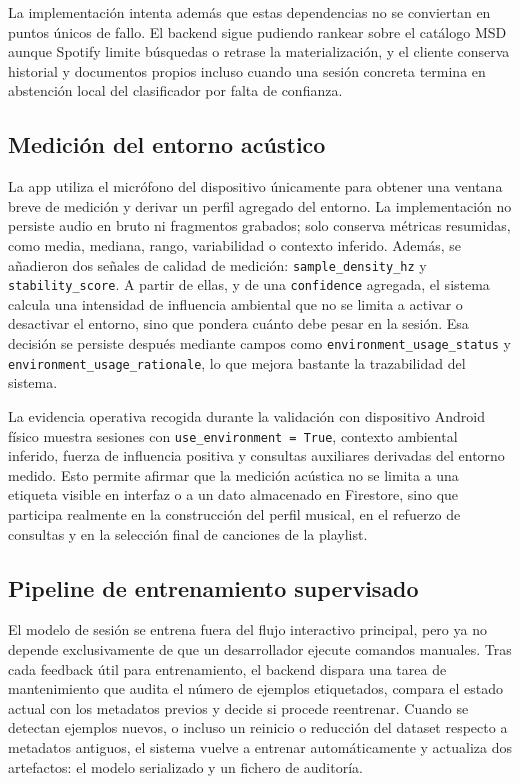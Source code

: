 La implementación intenta además que estas dependencias no se conviertan
en puntos únicos de fallo. El backend sigue pudiendo rankear sobre el catálogo
MSD aunque Spotify limite búsquedas o retrase la materialización, y el cliente conserva historial y
documentos propios incluso cuando una sesión concreta termina en abstención local
del clasificador por falta de confianza.

\subsection{Medición del entorno acústico}

La app utiliza el micrófono del dispositivo únicamente para obtener una ventana
breve de medición y derivar un perfil agregado del entorno. La implementación no
persiste audio en bruto ni fragmentos grabados; solo conserva métricas
resumidas, como media, mediana, rango, variabilidad o contexto inferido.
Además, se añadieron dos señales de calidad de medición:
\texttt{sample\_density\_hz} y \texttt{stability\_score}. A partir de ellas, y
de una \texttt{confidence} agregada, el sistema calcula una intensidad de
influencia ambiental que no se limita a activar o desactivar el entorno, sino
que pondera cuánto debe pesar en la sesión. Esa decisión se persiste después
mediante campos como \texttt{environment\_usage\_status} y
\texttt{environment\_usage\_rationale}, lo que mejora bastante la trazabilidad
del sistema.

La evidencia operativa recogida durante la validación con dispositivo Android
físico muestra sesiones con \texttt{use\_environment = True}, contexto
ambiental inferido, fuerza de influencia positiva y consultas auxiliares
derivadas del entorno medido. Esto permite afirmar que la medición acústica no
se limita a una etiqueta visible en interfaz o a un dato almacenado en
Firestore, sino que participa realmente en la construcción del perfil musical,
en el refuerzo de consultas y en la selección final de canciones de la
playlist.

\subsection{Pipeline de entrenamiento supervisado}

El modelo de sesión se entrena fuera del flujo interactivo principal, pero ya
no depende exclusivamente de que un desarrollador ejecute
comandos manuales. Tras cada feedback útil para entrenamiento, el backend
dispara una tarea de mantenimiento que audita el número de ejemplos etiquetados,
compara el estado actual con los metadatos previos y decide si procede
reentrenar. Cuando se detectan ejemplos nuevos, o incluso un reinicio o
reducción del dataset respecto a metadatos antiguos, el sistema vuelve a
entrenar automáticamente y actualiza dos artefactos: el modelo serializado y un
fichero de auditoría.

